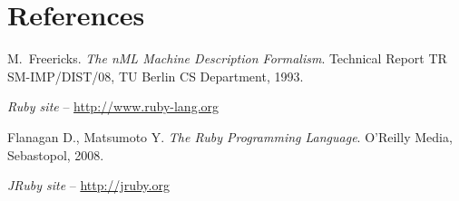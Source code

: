 \documentclass[oneside,final,12pt]{extreport}
\begin{document}
\section{References}



\begin{thebibliography}{1}

M.~Freericks.
\emph{The nML Machine Description Formalism}.
Technical Report TR SM-IMP/DIST/08, TU Berlin CS Department, 1993.

\emph{Ruby site} -- \url{http://www.ruby-lang.org}

Flanagan D., Matsumoto Y.
\emph{The Ruby Programming Language}.
O’Reilly Media, Sebastopol, 2008.

\emph{JRuby site} -- \url{http://jruby.org}

\end{thebibliography}
\end{document}
